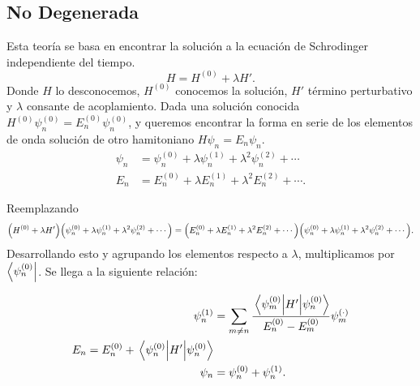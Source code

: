 \subsection{No Degenerada}
Esta teoría se basa en encontrar la solución a la ecuación de Schrodinger independiente del tiempo. 
	\begin{equation}
		H = H^{(0)} + \lambda H'. \label{perturbacion}
	\end{equation}
Donde $H$ lo desconocemos, $H^{(0)}$ conocemos la solución, $H'$ término perturbativo y $\lambda$ consante de acoplamiento. Dada una solución conocida $H^{(0)} \psi _n ^{(0)} = E_n ^{(0)} \psi _n ^{(0)}$, y queremos encontrar la forma en serie de los elementos de onda solución de otro hamitoniano $H \psi _n = E_n \psi _n$.
\begin{align*}
	\psi _n &= \psi _n ^{(0)} + \lambda \psi _n ^{(1)} + \lambda ^2 \psi _n ^{(2)} + \cdots \\
	E_n &= E_n ^{(0)} + \lambda E_n ^{(1)} + \lambda ^2 E_n ^{(2)} + \cdots .
\end{align*}
	
Reemplazando
\begin{equation}
	\qty(H^{(0)} + \lambda H') \qty(\psi _n ^{(0)} + \lambda \psi _n ^{(1)} + \lambda ^2 \psi _n ^{(2)} + \cdots) = \qty(E_n ^{(0)} + \lambda E_n ^{(1)} + \lambda ^2 E_n ^{(2)} + \cdots) \qty(\psi _n ^{(0)} + \lambda \psi _n ^{(1)} + \lambda ^2 \psi _n ^{(2)} + \cdots).
\end{equation}
Desarrollando esto y agrupando los elementos respecto a $\lambda$, multiplicamos por $\bra{\psi _n ^{(0)}}$. Se llega a la siguiente relación:

\begin{align*}
	\psi _n ^{(1)} &= \sum _{m\neq n} \frac{\mel{\psi _m ^{(0)}}{H'}{\psi _n ^{(0)}}}{E_n ^{(0)} - E_m ^{(0)}} \psi _m ^{(\cdot)} \\
	E_n = E_n ^{(0)} + \expval{H'}{\psi _n ^{(0)}} \\
	\psi _n &= \psi _n ^{(0)} + \psi _n ^{(1)}.
\end{align*}
	









